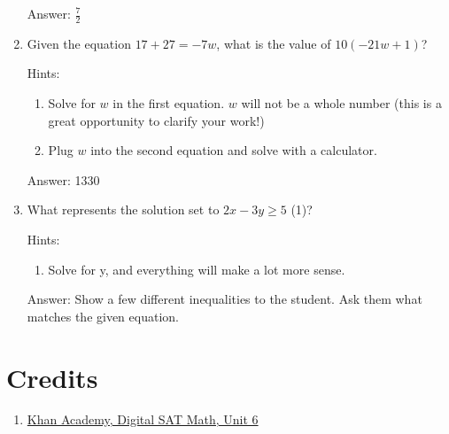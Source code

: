 \documentclass{article}
\begin{document}
\begin{enumerate}
{	      Answer: \(\frac{7}{2}\)}

	\item {Given the equation \(17+27=-7w\), what is the value of \(10(-21w+1)\)?

	      Hints:
	      \begin{enumerate}
		      \item {Solve for $w$ in the first equation. $w$ will not be a whole number (this is a great opportunity to clarify your work!)}
		      \item {Plug $w$ into the second equation and solve with a calculator.}
	      \end{enumerate}

	      Answer: 1330}
	\item {What represents the solution set to \(2x - 3y\geq5\) (1)?

	      Hints:
	      \begin{enumerate}
		      \item {Solve for y, and everything will make a lot more sense.}
	      \end{enumerate}

	      Answer: Show a few different inequalities to the student. Ask them what matches the given equation.}


\end{enumerate}

\section{Credits}
\begin{enumerate}

	\item{
	      \href{https://www.khanacademy.org/test-prep/v2-sat-math/x0fcc98a58ba3bea7:algebra-medium}{Khan Academy, Digital SAT Math, Unit 6}}

\end{enumerate}
\end{document}
